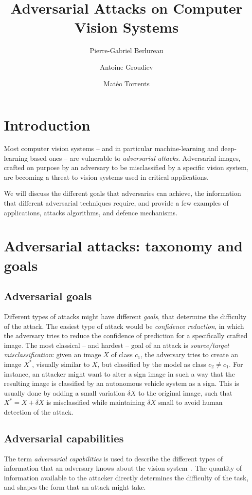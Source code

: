 \documentclass[twocolumn]{../cs-classes/cs-classes}
\title{Adversarial Attacks on Computer Vision Systems}
\author{Pierre-Gabriel Berlureau\and Antoine Groudiev\and Matéo Torrents}
\date{}
\begin{document}
\maketitle
\section{Introduction}
Most computer vision systems -- and in particular machine-learning and deep-learning based ones -- are vulnerable to \emph{adversarial attacks}. Adversarial images, crafted on purpose by an adversary to be misclassified by a specific vision system, are becoming a threat to vision systems used in critical applications.

We will discuss the different goals that adversaries can achieve, the information that different adversarial techniques require, and provide a few examples of applications, attacks algorithms, and defence mechanisms.

\section{Adversarial attacks: taxonomy and goals}
%
\subsection{Adversarial goals}
Different types of attacks might have different \emph{goals}, that determine the difficulty of the attack. The easiest type of attack would be \emph{confidence reduction}, in which the adversary tries to reduce the
confidence of prediction for a specifically crafted image. The most classical -- and hardest -- goal of an attack is \emph{source/target misclassification}: given an image $X$ of class $c_1$, the adversary tries to create an image $X^*$, visually similar to $X$, but classified by the model as class $c_2\neq c_1$. For instance, an attacker might want to alter a  sign image in such a way that the resulting image is classified by an autonomous vehicle system as a  sign. This is usually done by adding a small variation $\delta X$ to the original image, such that $X^*=X+\delta X$ is misclassified while maintaining $\delta X$ small to avoid human detection of the attack.

\subsection{Adversarial capabilities}
The term \emph{adversarial capabilities} is used to describe the different types of information that an adversary knows about the vision system \cite{chakraborty2021survey}. The quantity of information available to the attacker directly determines the difficulty of the task, and shapes the form that an attack might take.
\end{document}
